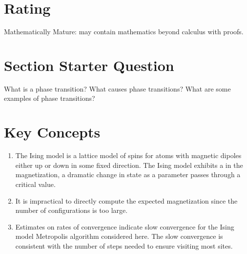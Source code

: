 \documentclass[12pt]{article}
\begin{document}
\myheader \mytitle

\hr


\hr

\usefirefox

\hr



\section*{Rating} %
Mathematically Mature:  may contain mathematics beyond calculus with
proofs.  %

\hr

\section*{Section Starter Question}

What is a phase transition?  What causes phase transitions?  What are
some examples of phase transitions?

\hr

\section*{Key Concepts}

\begin{enumerate}
    \item
        The Ising model is a lattice model of spins for atoms with
        magnetic dipoles either up or down in some fixed direction.  The
        Ising model exhibits a  in the
        magnetization, a dramatic change in state as a parameter passes
        through a critical value.
    \item
        It is impractical to directly compute the expected magnetization
        since the number of configurations is too large.
    \item
        Estimates on rates of convergence indicate slow convergence for
        the Ising model Metropolis algorithm considered here.  The slow
        convergence is consistent with the number of steps needed to
        ensure visiting most sites.
\end{enumerate}
\end{document}
